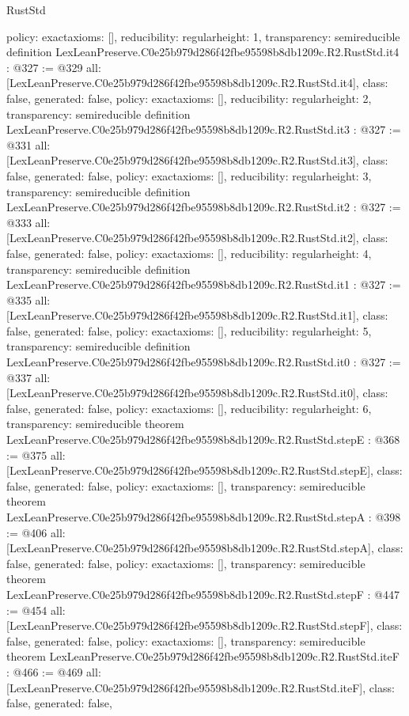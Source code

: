 \begin{lexlean}{RustStd}
\begin{coremodule}
{  policy: exact{axioms: []},
  reducibility: regular{height: 1},
  transparency: semireducible
}
definition LexLeanPreserve.C0e25b979d286f42fbe95598b8db1209c.R2.RustStd.it4 : @327 := @329 {
  all: [LexLeanPreserve.C0e25b979d286f42fbe95598b8db1209c.R2.RustStd.it4],
  class: false,
  generated: false,
  policy: exact{axioms: []},
  reducibility: regular{height: 2},
  transparency: semireducible
}
definition LexLeanPreserve.C0e25b979d286f42fbe95598b8db1209c.R2.RustStd.it3 : @327 := @331 {
  all: [LexLeanPreserve.C0e25b979d286f42fbe95598b8db1209c.R2.RustStd.it3],
  class: false,
  generated: false,
  policy: exact{axioms: []},
  reducibility: regular{height: 3},
  transparency: semireducible
}
definition LexLeanPreserve.C0e25b979d286f42fbe95598b8db1209c.R2.RustStd.it2 : @327 := @333 {
  all: [LexLeanPreserve.C0e25b979d286f42fbe95598b8db1209c.R2.RustStd.it2],
  class: false,
  generated: false,
  policy: exact{axioms: []},
  reducibility: regular{height: 4},
  transparency: semireducible
}
definition LexLeanPreserve.C0e25b979d286f42fbe95598b8db1209c.R2.RustStd.it1 : @327 := @335 {
  all: [LexLeanPreserve.C0e25b979d286f42fbe95598b8db1209c.R2.RustStd.it1],
  class: false,
  generated: false,
  policy: exact{axioms: []},
  reducibility: regular{height: 5},
  transparency: semireducible
}
definition LexLeanPreserve.C0e25b979d286f42fbe95598b8db1209c.R2.RustStd.it0 : @327 := @337 {
  all: [LexLeanPreserve.C0e25b979d286f42fbe95598b8db1209c.R2.RustStd.it0],
  class: false,
  generated: false,
  policy: exact{axioms: []},
  reducibility: regular{height: 6},
  transparency: semireducible
}
theorem LexLeanPreserve.C0e25b979d286f42fbe95598b8db1209c.R2.RustStd.stepE : @368 := @375 {
  all: [LexLeanPreserve.C0e25b979d286f42fbe95598b8db1209c.R2.RustStd.stepE],
  class: false,
  generated: false,
  policy: exact{axioms: []},
  transparency: semireducible
}
theorem LexLeanPreserve.C0e25b979d286f42fbe95598b8db1209c.R2.RustStd.stepA : @398 := @406 {
  all: [LexLeanPreserve.C0e25b979d286f42fbe95598b8db1209c.R2.RustStd.stepA],
  class: false,
  generated: false,
  policy: exact{axioms: []},
  transparency: semireducible
}
theorem LexLeanPreserve.C0e25b979d286f42fbe95598b8db1209c.R2.RustStd.stepF : @447 := @454 {
  all: [LexLeanPreserve.C0e25b979d286f42fbe95598b8db1209c.R2.RustStd.stepF],
  class: false,
  generated: false,
  policy: exact{axioms: []},
  transparency: semireducible
}
theorem LexLeanPreserve.C0e25b979d286f42fbe95598b8db1209c.R2.RustStd.iteF : @466 := @469 {
  all: [LexLeanPreserve.C0e25b979d286f42fbe95598b8db1209c.R2.RustStd.iteF],
  class: false,
  generated: false,
}
\end{coremodule}
\end{lexlean}
